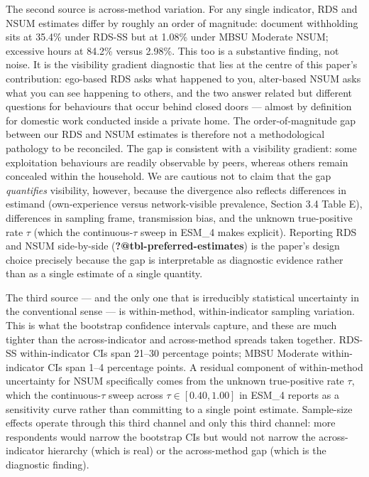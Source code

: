 \documentclass[
  12pt,
  letterpaper,
  DIV=11,
  numbers=noendperiod]{scrartcl}
\begin{document}
The second source is across-method variation. For any single indicator,
RDS and NSUM estimates differ by roughly an order of magnitude: document
withholding sits at 35.4\% under RDS-SS but at 1.08\% under MBSU
Moderate NSUM; excessive hours at 84.2\% versus 2.98\%. This too is a
substantive finding, not noise. It is the visibility gradient diagnostic
that lies at the centre of this paper's contribution: ego-based RDS asks
what happened to you, alter-based NSUM asks what you can see happening
to others, and the two answer related but different questions for
behaviours that occur behind closed doors --- almost by definition for
domestic work conducted inside a private home. The order-of-magnitude
gap between our RDS and NSUM estimates is therefore not a methodological
pathology to be reconciled. The gap is consistent with a visibility
gradient: some exploitation behaviours are readily observable by peers,
whereas others remain concealed within the household. We are cautious
not to claim that the gap \emph{quantifies} visibility, however, because
the divergence also reflects differences in estimand (own-experience
versus network-visible prevalence, Section 3.4 Table E), differences in
sampling frame, transmission bias, and the unknown true-positive rate
\(\tau\) (which the continuous-\(\tau\) sweep in ESM\_4 makes explicit).
Reporting RDS and NSUM side-by-side (\textbf{?@tbl-preferred-estimates})
is the paper's design choice precisely because the gap is interpretable
as diagnostic evidence rather than as a single estimate of a single
quantity.

The third source --- and the only one that is irreducibly statistical
uncertainty in the conventional sense --- is within-method,
within-indicator sampling variation. This is what the bootstrap
confidence intervals capture, and these are much tighter than the
across-indicator and across-method spreads taken together. RDS-SS
within-indicator CIs span 21--30 percentage points; MBSU Moderate
within-indicator CIs span 1--4 percentage points. A residual component
of within-method uncertainty for NSUM specifically comes from the
unknown true-positive rate \(\tau\), which the continuous-\(\tau\) sweep
across \(\tau \in [0.40, 1.00]\) in ESM\_4 reports as a sensitivity
curve rather than committing to a single point estimate. Sample-size
effects operate through this third channel and only this third channel:
more respondents would narrow the bootstrap CIs but would not narrow the
across-indicator hierarchy (which is real) or the across-method gap
(which is the diagnostic finding).
\end{document}
